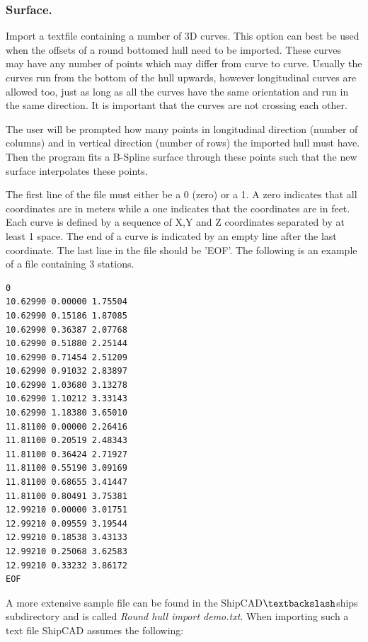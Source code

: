 \documentclass[12pt]{article}
\begin{document}
\subsubsection{Surface.}
Import a textfile containing a number of 3D curves. This option can
best be used when the offsets of a round bottomed hull need to be
imported. These curves may have any number of points which may differ
from curve to curve. Usually the curves run from the bottom of the
hull upwards, however longitudinal curves are allowed too, just as
long as all the curves have the same orientation and run in the same
direction. It is important that the curves are not crossing each
other.

The user will be prompted how many points in longitudinal direction
(number of columns) and in vertical direction (number of rows) the
imported hull must have. Then the program fits a B-Spline surface
through these points such that the new surface interpolates these
points.

The first line of the file must either be a 0 (zero) or a 1. A zero
indicates that all coordinates are in meters while a one indicates
that the coordinates are in feet. Each curve is defined by a sequence
of X,Y and Z coordinates separated by at least 1 space. The end of a
curve is indicated by an empty line after the last coordinate. The
last line in the file should be 'EOF'. The following is an example of
a file containing 3 stations.

\begin{verbatim}
0 
10.62990 0.00000 1.75504 
10.62990 0.15186 1.87085 
10.62990 0.36387 2.07768 
10.62990 0.51880 2.25144
10.62990 0.71454 2.51209 
10.62990 0.91032 2.83897 
10.62990 1.03680 3.13278 
10.62990 1.10212 3.33143 
10.62990 1.18380 3.65010 
11.81100 0.00000 2.26416 
11.81100 0.20519 2.48343 
11.81100 0.36424 2.71927 
11.81100 0.55190 3.09169 
11.81100 0.68655 3.41447 
11.81100 0.80491 3.75381 
12.99210 0.00000 3.01751 
12.99210 0.09559 3.19544 
12.99210 0.18538 3.43133 
12.99210 0.25068 3.62583 
12.99210 0.33232 3.86172 
EOF 
\end{verbatim}

A more extensive sample file can be found in the ShipCAD$\textbackslash$ships
subdirectory and is called \textit{Round hull import demo.txt}. When
importing such a text file ShipCAD assumes the following:
\end{document}
